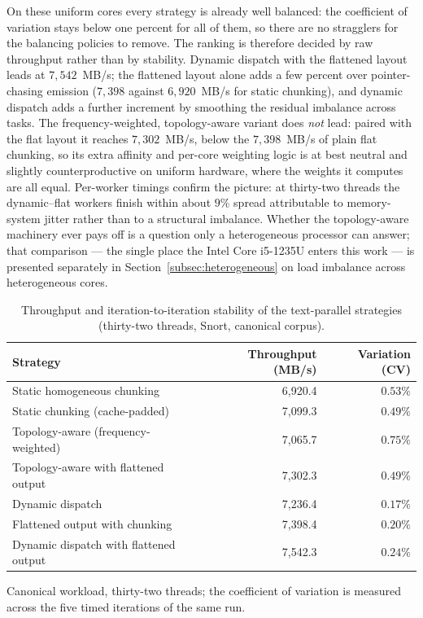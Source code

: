 On these uniform cores every strategy is already well balanced: the coefficient of
variation stays below one percent for all of them, so there are no stragglers for
the balancing policies to remove. The ranking is therefore decided by raw
throughput rather than by stability. Dynamic dispatch with the flattened layout
leads at $7{,}542$~MB/s; the flattened layout alone adds a few percent over
pointer-chasing emission ($7{,}398$ against $6{,}920$~MB/s for static chunking),
and dynamic dispatch adds a further increment by smoothing the residual imbalance
across tasks. The frequency-weighted, topology-aware variant does \emph{not} lead:
paired with the flat layout it reaches $7{,}302$~MB/s, below the $7{,}398$~MB/s of
plain flat chunking, so its extra affinity and per-core weighting logic is at best
neutral and slightly counterproductive on uniform hardware, where the weights it
computes are all equal. Per-worker timings confirm the picture: at thirty-two
threads the dynamic--flat workers finish within about $9\%$
spread attributable to memory-system jitter rather than to a structural imbalance.
Whether the topology-aware machinery ever pays off is a question only a
heterogeneous processor can answer; that comparison --- the single place the Intel
Core i5-1235U enters this work --- is presented separately in
Section~\ref{subsec:heterogeneous} on load imbalance across heterogeneous cores.

\begin{table}[H]
    \centering
    \caption{Throughput and iteration-to-iteration stability of the text-parallel strategies (thirty-two threads, Snort, canonical corpus).}
    \label{tab:balance}
    \small
    \begin{tabular}{@{} l r r @{}}
        \toprule
        \textbf{Strategy} & \textbf{Throughput (MB/s)} & \textbf{Variation (CV)} \\
        \midrule
        Static homogeneous chunking            & 6{,}920.4 & $0.53\%$ \\
        Static chunking (cache-padded)         & 7{,}099.3 & $0.49\%$ \\
        Topology-aware (frequency-weighted)    & 7{,}065.7 & $0.75\%$ \\
        Topology-aware with flattened output   & 7{,}302.3 & $0.49\%$ \\
        Dynamic dispatch                       & 7{,}236.4 & $0.17\%$ \\
        Flattened output with chunking         & 7{,}398.4 & $0.20\%$ \\
        Dynamic dispatch with flattened output & 7{,}542.3 & $0.24\%$ \\
        \bottomrule
    \end{tabular}

    {\footnotesize\raggedright Canonical workload, thirty-two threads; the coefficient of variation is measured across the five timed iterations of the same run.\par}
\end{table}

